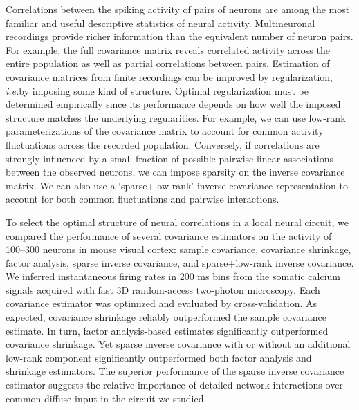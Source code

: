 Correlations between the spiking activity of pairs of neurons are among the most familiar and useful descriptive statistics of neural activity. Multineuronal recordings provide richer information than the equivalent number of neuron pairs. For example, the full covariance matrix reveals correlated activity across the entire population as well as partial correlations between pairs.  Estimation of covariance matrices from finite recordings can be improved by regularization, \emph{i.e.}\;by imposing some kind of structure.  Optimal regularization must be determined empirically since its performance depends on how well the imposed structure matches the underlying regularities. For example, we can use low-rank parameterizations of the covariance matrix to account for common activity fluctuations across the recorded population. Conversely, if correlations are strongly influenced by a small fraction of possible pairwise linear associations between the observed neurons, we can impose sparsity on the inverse covariance matrix. We can also use a `sparse+low rank’ inverse covariance representation to account for both common fluctuations and pairwise interactions.  

To select the optimal structure of neural correlations in a local neural circuit, we compared the performance of several covariance estimators on the activity of 100--300 neurons in mouse visual cortex: sample covariance, covariance shrinkage, factor analysis, sparse inverse covariance, and sparse+low-rank inverse covariance. We inferred instantaneous firing rates in 200 ms bins from the somatic calcium signals acquired with fast 3D random-access two-photon microscopy.  Each covariance estimator was optimized and evaluated by cross-validation. As expected, covariance shrinkage reliably outperformed the sample covariance estimate. In turn, factor analysis-based estimates significantly outperformed covariance shrinkage. Yet sparse inverse covariance with or without an additional low-rank component significantly outperformed both factor analysis and shrinkage estimators. The superior performance of the sparse inverse covariance estimator suggests the relative importance of detailed network interactions over common diffuse input in the circuit we studied.
